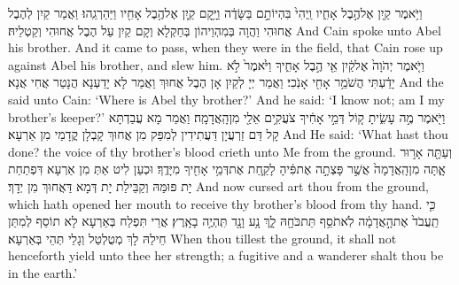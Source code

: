 {וַיֹּ֥אמֶר קַ֖יִן אֶל\maqqaf הֶ֣בֶל אָחִ֑יו וַֽיְהִי֙ בִּהְיוֹתָ֣ם בַּשָּׂדֶ֔ה וַיָּ֥קׇם קַ֛יִן אֶל\maqqaf הֶ֥בֶל אָחִ֖יו וַיַּהַרְגֵֽהוּ׃}
{וַאֲמַר קַיִן לְהֶבֶל אֲחוּהִי וַהֲוָה בְּמִהְוֵיהוֹן בְּחַקְלָא וְקָם קַיִן עַל הֶבֶל אֲחוּהִי וְקַטְלֵיהּ׃}
{And Cain spoke unto Abel his brother. And it came to pass, when they were in the field, that Cain rose up against Abel his brother, and slew him.}{}
{וַיֹּ֤אמֶר יְהֹוָה֙ אֶל\maqqaf קַ֔יִן אֵ֖י הֶ֣בֶל אָחִ֑יךָ וַיֹּ֙אמֶר֙ לֹ֣א יָדַ֔עְתִּי הֲשֹׁמֵ֥ר אָחִ֖י אָנֹֽכִי׃}
{וַאֲמַר יְיָ לְקַיִן אָן הֶבֶל אֲחוּךְ וַאֲמַר לָא יָדַעְנָא הֲנָטַר אֲחִי אֲנָא׃}
{And the \lord\space said unto Cain: ‘Where is Abel thy brother?’ And he said: ‘I know not; am I my brother’s keeper?’}{}
{וַיֹּ֖אמֶר מֶ֣ה עָשִׂ֑יתָ ק֚וֹל דְּמֵ֣י אָחִ֔יךָ צֹעֲקִ֥ים אֵלַ֖י מִן\maqqaf הָֽאֲדָמָֽה׃}
{וַאֲמַר מָא עֲבַדְתָּא קָל דַּם זַרְעֲיָן דַּעֲתִידִין לְמִפַּק מִן אֲחוּךְ קָבְלָן קֳדָמַי מִן אַרְעָא׃}
{And He said: ‘What hast thou done? the voice of thy brother’s blood crieth unto Me from the ground.}{}
{וְעַתָּ֖ה אָר֣וּר אָ֑תָּה מִן\maqqaf הָֽאֲדָמָה֙ אֲשֶׁ֣ר פָּצְתָ֣ה אֶת\maqqaf פִּ֔יהָ לָקַ֛חַת אֶת\maqqaf דְּמֵ֥י אָחִ֖יךָ מִיָּדֶֽךָ׃}
{וּכְעַן לִיט אַתְּ מִן אַרְעָא דִּפְתַחַת יָת פּוּמַּהּ וְקַבֵּילַת יָת דְּמָא דַּאֲחוּךְ מִן יְדָךְ׃}
{And now cursed art thou from the ground, which hath opened her mouth to receive thy brother’s blood from thy hand.}{}
{כִּ֤י תַֽעֲבֹד֙ אֶת\maqqaf הָ֣אֲדָמָ֔ה לֹֽא\maqqaf תֹסֵ֥ף תֵּת\maqqaf כֹּחָ֖הּ לָ֑ךְ נָ֥ע וָנָ֖ד תִּֽהְיֶ֥ה בָאָֽרֶץ׃}
{אֲרֵי תִּפְלַח בְּאַרְעָא לָא תוֹסֵף לְמִתַּן חֵילַהּ לָךְ מְטֻלְטַל וְגָלֵי תְּהֵי בְּאַרְעָא׃}
{When thou tillest the ground, it shall not henceforth yield unto thee her strength; a fugitive and a wanderer shalt thou be in the earth.’}{}

